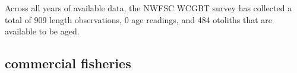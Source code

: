 \documentclass[11pt,
  english,
  letterpaper,
]{article}
\begin{document}
\leavevmode\tagmcend\tagstructend\par


Across all years of available data, the NWFSC WCGBT survey has collected a total of 909 length observations, 0 age readings, and 484 otoliths that are available to be aged.

\leavevmode\tagmcend\tagstructend\par


\hypertarget{commercial-fisheries-45}{%
\subsection{commercial fisheries}\label{commercial-fisheries-45}}

\leavevmode\tagmcend\tagstructend


\begingroup\fontsize{10}{12}\selectfont \begingroup\fontsize{10}{12}\selectfont

\leavevmode\tagmcend\tagstructend\par
\end{document}

